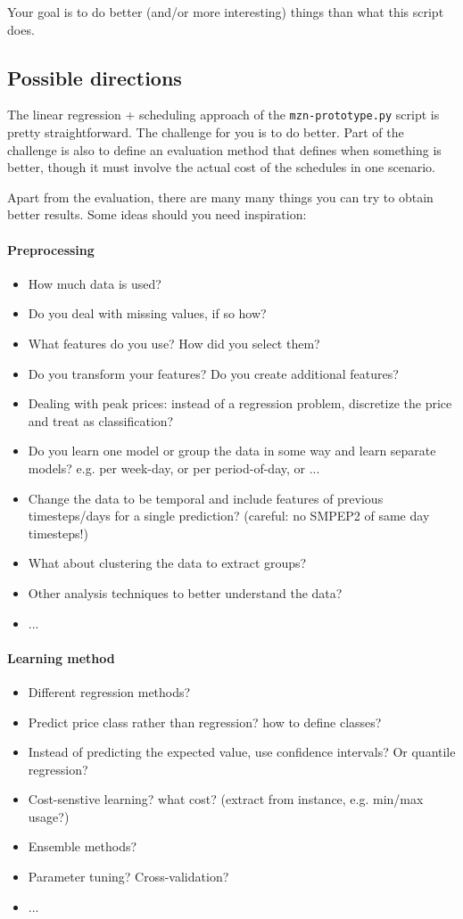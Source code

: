 \documentclass[a4,12pt]{article}
\begin{document}
Your goal is to do better (and/or more interesting) things than what this script does.

\subsection*{Possible directions}
The linear regression + scheduling approach of the \texttt{mzn-prototype.py} script is pretty straightforward. The challenge for you is to do better. Part of the challenge is also to define an evaluation method that defines when something is better, though it must involve the actual cost of the schedules in one scenario.

Apart from the evaluation, there are many many things you can try to obtain better results. Some ideas should you need inspiration:
\paragraph{Preprocessing}
\begin{itemize}
\item How much data is used?
\item Do you deal with missing values, if so how?
\item What features do you use? How did you select them?
\item Do you transform your features? Do you create additional features?
\item Dealing with peak prices: instead of a regression problem, discretize the price and treat as classification?
\item Do you learn one model or group the data in some way and learn separate models? e.g. per week-day, or per period-of-day, or ...
\item Change the data to be temporal and include features of previous timesteps/days for a single prediction? (careful: no SMPEP2 of same day timesteps!)
\item What about clustering the data to extract groups?
\item Other analysis techniques to better understand the data?
\item ...
\end{itemize}

\paragraph{Learning method}
\begin{itemize}
\item Different regression methods?
\item Predict price class rather than regression? how to define classes?
\item Instead of predicting the expected value, use confidence intervals? Or quantile regression?
\item Cost-senstive learning? what cost? (extract from instance, e.g. min/max usage?)
\item Ensemble methods?
\item Parameter tuning? Cross-validation?
\item ...
\end{itemize}
\end{document}

